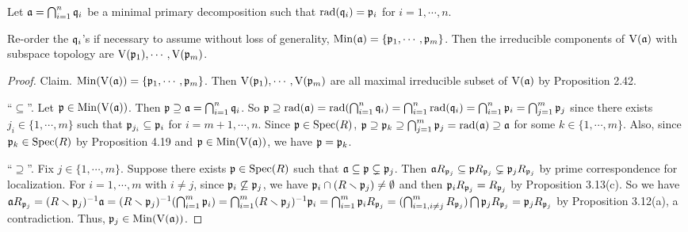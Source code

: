 \noindent Let $\mathfrak{a} = \bigcap_{i=1}^{n} \mathfrak{q}_i$ be a minimal primary decomposition such that $\operatorname{rad}(\mathfrak{q}_i) = \mathfrak{p}_i$ for $i = 1,\cdots,n$.

\begin{proposition}
    Re-order the $\mathfrak{q}_i$'s if necessary to assume without loss of generality, $\operatorname{Min}(\mathfrak{a}) = \{\mathfrak{p}_1,\cdots,\mathfrak{p}_m\}$. Then the irreducible components of $\operatorname{V}(\mathfrak{a})$ with subspace topology are $\operatorname{V}(\mathfrak{p}_1),\cdots,\operatorname{V}(\mathfrak{p}_m)$.
\end{proposition}

\begin{proof}
    Claim. $\operatorname{Min}(\operatorname{V}(\mathfrak{a})) = \{\mathfrak{p}_1,\cdots,\mathfrak{p}_m\}$. Then $\operatorname{V}(\mathfrak{p}_1),\cdots,\operatorname{V}(\mathfrak{p}_m)$ are all maximal irreducible subset of $\operatorname{V}(\mathfrak{a})$ by Proposition 2.42. \par
    ``$\subseteq$''. Let $\mathfrak{p} \in \operatorname{Min}(\operatorname{V}(\mathfrak{a}))$. Then $\mathfrak{p} \supseteq \mathfrak{a} = \bigcap_{i=1}^{n} \mathfrak{q}_i$. So $\mathfrak{p} \supseteq \operatorname{rad}(\mathfrak{a}) = \operatorname{rad}(\bigcap_{i=1}^{n}\mathfrak{q}_i) = \bigcap_{i=1}^{n} \operatorname{rad}(\mathfrak{q}_i) = \bigcap_{i=1}^{n} \mathfrak{p}_i = \bigcap_{j=1}^{m} \mathfrak{p}_j$ since there exists $j_i \in \{1,\cdots,m\}$ such that $\mathfrak{p}_{j_i} \subseteq \mathfrak{p}_i$ for $i = m+1,\cdots,n$. Since $\mathfrak{p} \in \operatorname{Spec}(R)$, $\mathfrak{p} \supseteq \mathfrak{p}_k \supseteq \bigcap_{j=1}^{m} \mathfrak{p}_j = \operatorname{rad}(\mathfrak{a}) \supseteq \mathfrak{a}$ for some $k \in \{1,\cdots,m\}$. Also, since $\mathfrak{p}_k \in \operatorname{Spec}(R)$ by Proposition 4.19 and $\mathfrak{p} \in \operatorname{Min}(\operatorname{V}(\mathfrak{a}))$, we have $\mathfrak{p} = \mathfrak{p}_k$. \par 
    ``$\supseteq$''. Fix $j \in \{1,\cdots,m\}$. Suppose there exists $\mathfrak{p} \in \operatorname{Spec}(R)$ such that $\mathfrak{a} \subseteq \mathfrak{p} \subsetneq \mathfrak{p}_j$. Then $\mathfrak{a} R_{\mathfrak{p}_j} \subseteq \mathfrak{p} R_{\mathfrak{p}_j} \subsetneq \mathfrak{p}_jR_{\mathfrak{p}_j}$ by prime correspondence for localization. For $i = 1,\cdots,m$ with $i \neq j$, since $\mathfrak{p}_i \not \subseteq \mathfrak{p}_j$, we have $\mathfrak{p}_i \cap (R \smallsetminus \mathfrak{p}_j) \neq \emptyset$ and then $\mathfrak{p}_i R_{\mathfrak{p}_j} = R_{\mathfrak{p}_j}$ by Proposition 3.13(c). So we have $\mathfrak{a} R_{\mathfrak{p}_j} = (R \smallsetminus \mathfrak{p}_j)^{-1} \mathfrak{a} = (R \smallsetminus \mathfrak{p}_j)^{-1} (\bigcap_{i=1}^{m} \mathfrak{p}_i) = \bigcap_{i=1}^{m} (R \smallsetminus \mathfrak{p}_j)^{-1} \mathfrak{p}_i = \bigcap_{i=1}^{m} \mathfrak{p}_i R_{\mathfrak{p}_j} = (\bigcap_{i=1,i \neq j}^{m} R_{\mathfrak{p}_j}) \bigcap \mathfrak{p}_jR_{\mathfrak{p}_j} = \mathfrak{p}_jR_{\mathfrak{p}_j}$ by Proposition 3.12(a), a contradiction. Thus, $\mathfrak{p}_j \in \operatorname{Min}(\operatorname{V}(\mathfrak{a}))$.
\end{proof}

